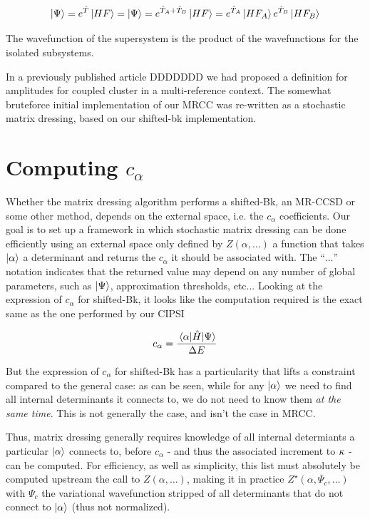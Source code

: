 \documentclass[./thesis.tex]{subfiles}
\begin{document}
\begin{equation}
\ket \Psi = e^{\hat T} \ket {HF} = \ket \Psi = e^{\hat T_A + \hat T_B} \ket {HF} = e^{\hat T_A} \ket {HF_A} e^{\hat T_B} \ket {HF_B}
\end{equation}

The wavefunction of the supersystem is the product of the wavefunctions for the isolated subsystems.


In a previously published article \alert{DDDDDDD} we had proposed a definition for amplitudes for coupled cluster in a multi-reference context. The somewhat bruteforce initial implementation of our MRCC was re-written as a stochastic matrix dressing, based on our shifted-bk implementation.

\section{Computing $c_\alpha$}
Whether the matrix dressing algorithm performs a shifted-Bk, an MR-CCSD or some other method, depends on the external space, i.e. the $c_\alpha$ coefficients. Our goal is to set up a framework in which stochastic matrix dressing can be done efficiently using an external space only defined by $Z(\alpha, \ldots)$ a function that takes ${\ket{\alpha}}$ a determinant and returns the $c_\alpha$ it should be associated with. The ``$\ldots$'' notation indicates that the returned value may depend on any number of global parameters, such as $\ket \Psi$, approximation thresholds, etc...
Looking at the expression of $c_\alpha$ for shifted-Bk, it looks like the computation required is the exact same as the one performed by our CIPSI

\begin{equation}
c_\alpha = \frac{\mel{\alpha}{\hat{H}}{\Psi}}{\Delta E}
\end{equation}


But the expression of $c_\alpha$ for shifted-Bk has a particularity that lifts a constraint compared to the general case: as can be seen, while for any ${\ket{\alpha}}$ we need to find all internal determinants it connects to, we do not need to know them \emph{at the same time}. This is not generally the case, and isn't the case in MRCC.

Thus, matrix dressing generally requires knowledge of all internal determiants a particular ${\ket{\alpha}}$ connects to, before $c_\alpha$ - and thus the associated increment to $\bf \kappa$ - can be computed. For efficiency, as well as simplicity, this list must absolutely be computed upstream the call to $Z(\alpha, \ldots)$, making it in practice $Z^\star(\alpha, \Psi_{c}, \ldots)$ with $\Psi_{c}$ the variational wavefunction stripped of all determinants that do not connect to ${\ket{\alpha}}$ (thus not normalized). 
\end{document}
